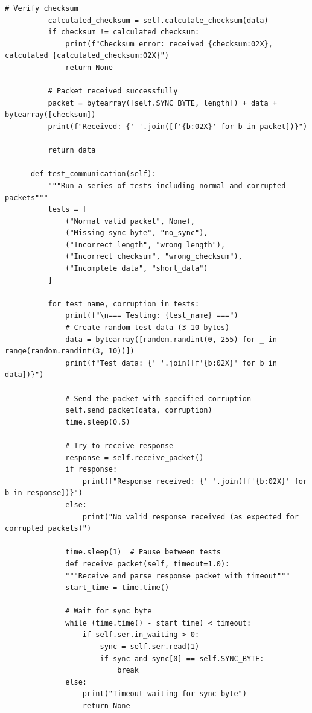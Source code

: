 \documentclass{article}
\begin{document}
\begin{lstlisting}[caption={client}, label={lst:example}]
          # Verify checksum
          calculated_checksum = self.calculate_checksum(data)
          if checksum != calculated_checksum:
              print(f"Checksum error: received {checksum:02X}, calculated {calculated_checksum:02X}")
              return None
              
          # Packet received successfully
          packet = bytearray([self.SYNC_BYTE, length]) + data + bytearray([checksum])
          print(f"Received: {' '.join([f'{b:02X}' for b in packet])}")
          
          return data
  
      def test_communication(self):
          """Run a series of tests including normal and corrupted packets"""
          tests = [
              ("Normal valid packet", None),
              ("Missing sync byte", "no_sync"),
              ("Incorrect length", "wrong_length"),
              ("Incorrect checksum", "wrong_checksum"),
              ("Incomplete data", "short_data")
          ]
          
          for test_name, corruption in tests:
              print(f"\n=== Testing: {test_name} ===")
              # Create random test data (3-10 bytes)
              data = bytearray([random.randint(0, 255) for _ in range(random.randint(3, 10))])
              print(f"Test data: {' '.join([f'{b:02X}' for b in data])}")
              
              # Send the packet with specified corruption
              self.send_packet(data, corruption)
              time.sleep(0.5)
              
              # Try to receive response
              response = self.receive_packet()
              if response:
                  print(f"Response received: {' '.join([f'{b:02X}' for b in response])}")
              else:
                  print("No valid response received (as expected for corrupted packets)")
              
              time.sleep(1)  # Pause between tests
              def receive_packet(self, timeout=1.0):
              """Receive and parse response packet with timeout"""
              start_time = time.time()
              
              # Wait for sync byte
              while (time.time() - start_time) < timeout:
                  if self.ser.in_waiting > 0:
                      sync = self.ser.read(1)
                      if sync and sync[0] == self.SYNC_BYTE:
                          break
              else:
                  print("Timeout waiting for sync byte")
                  return None
                  

\end{lstlisting}
\end{document}

